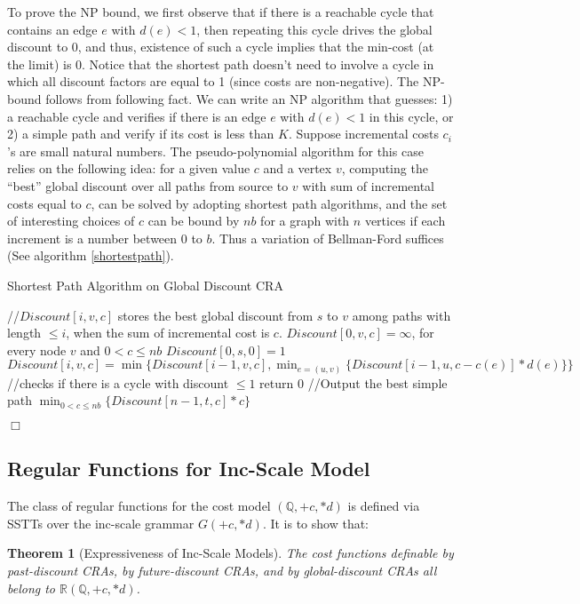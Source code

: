 \documentclass[11pt]{article}
\newtheorem{theorem}{Theorem}
\def\qed{{\bf $\Box$}}
\newcommand{\mypar}[1]{\subsection{#1}}
\def\qed{{\bf $\Box$}}
\newcommand{\Rat}{\ensuremath{\mathbb{Q}}}
\newcommand{\CG}{G}
\newcommand{\reg}[1]{{\mathbb R}(#1)}
\newcommand{\np}{{\sc\textsc NP}\xspace}
\begin{document}
To prove the \np bound, we first observe that if there is a reachable cycle that
contains an edge $e$ with $d(e)<1$, then repeating this cycle
drives the global discount to 0, and thus, existence of such a cycle implies
that the min-cost (at the limit) is 0.
Notice that the shortest path doesn't need to involve a cycle
in which all discount factors are equal to 1 (since costs are non-negative).
The \np-bound follows from following fact. We can write an \np algorithm that guesses: 1) a reachable cycle and verifies if there is an edge $e$ with $d(e)<1$ in this cycle, or 2) a simple path and verify if its cost is less than $K$.
Suppose incremental costs $c_i$'s are small natural numbers.
The pseudo-polynomial algorithm for this case relies on the following idea: for a given value $c$ and a vertex $v$,
computing the ``best'' global discount over all paths from source to $v$ with
sum of incremental costs equal to $c$, can be solved by adopting shortest path algorithms, and
the set of interesting choices of $c$ can be bound by $nb$ for a graph with $n$ vertices if
each increment is a number between $0$ to $b$. Thus a variation of Bellman-Ford suffices (See algorithm \ref{shortestpath}).
\begin{algorithm}
\caption{Shortest Path Algorithm on Global Discount CRA }
\label{shortestpath}
\begin{algorithmic}
    \STATE \slash \slash $Discount[i,v,c]$ stores the best global discount from $s$ to $v$ among paths with length $\le i$, when the sum of incremental cost is $c$.
    \STATE $Discount[0,v,c]=\infty$, for every node $v$ and $0< c\leq nb$
    \STATE $Discount[0,s,0]=1$
            \STATE $Discount[i,v,c]=\min\{Discount[i-1,v,c],\min_{e=(u,v)}\{Discount[i-1,u,c-c(e)]*d(e)\}\}$
        \ENDFOR
    \ENDFOR
    \STATE \slash \slash checks if there is a cycle with discount $\le 1$
        \STATE return $0$
    \ENDIF
    \STATE \slash \slash Output the best simple path
    \RETURN $\min_{0<c\leq nb}\{Discount[n-1,t,c]*c\}$
\end{algorithmic}
\end{algorithm}
\qed

\mypar{Regular Functions for Inc-Scale Model} The class of regular
functions for the cost model $(\Rat,+c,*d)$ is defined via
SSTTs over the inc-scale grammar $\CG(+c,*d)$. It is to show that:

\begin{theorem}[Expressiveness of Inc-Scale Models]
The cost functions definable by past-discount CRAs, by
future-discount CRAs, and by global-discount CRAs all belong to
$\reg{\Rat,+c,*d}$.
\end{theorem}
\end{document}
